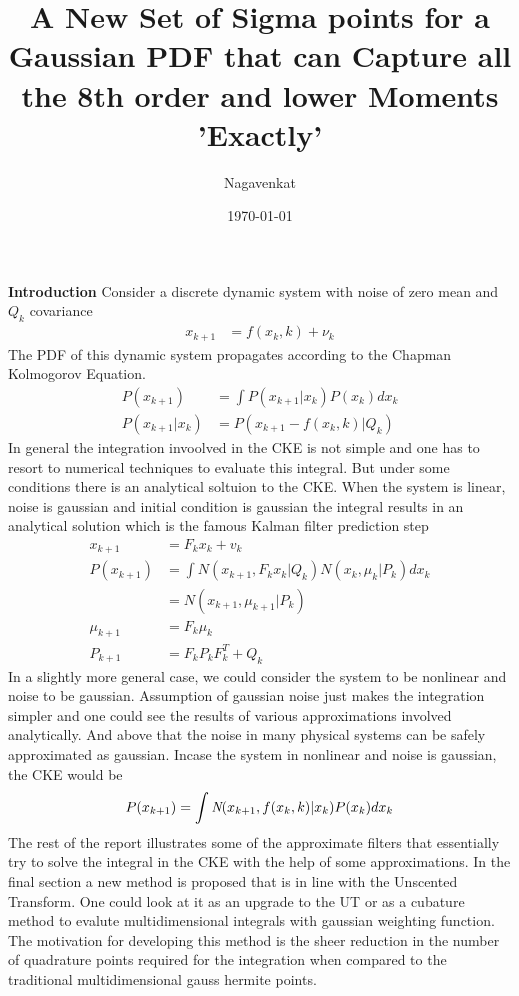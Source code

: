 \documentclass{article}
\title{A New Set of Sigma points for a Gaussian PDF that can Capture all the 8th order and lower Moments 'Exactly'}
\date{\today}
\author{Nagavenkat}
\begin{document}
\maketitle
{\bf Introduction}\newline\newline
Consider a discrete dynamic system with noise of zero mean and $Q_k$ covariance
\begin{align}
x_{k+1}&=f(x_k,k)+\nu_k
\end{align}
	The PDF of this dynamic system propagates according to the Chapman Kolmogorov Equation.
	\begin{align}
	P(x_{k+1})&=\int{P(x_{k+1}|x_k)P(x_k)}dx_k\\
	P(x_{k+1}|x_k)&=P(x_{k+1}-f(x_k,k)|Q_k)
	\end{align}
	In general the integration invoolved in the CKE is not simple and one has to resort to numerical techniques to evaluate this integral. But under some conditions there is an analytical soltuion to the CKE. When the system is linear, noise is gaussian and initial condition is gaussian the integral results in an analytical solution which is the famous Kalman filter prediction step 
	\begin{align}
	x_{k+1}&=F_kx_k+v_k\\
	P(x_{k+1})&=\int{N(x_{k+1},F_kx_k|Q_k)N(x_k,\mu_k|P_k)}dx_k\\
            &=N(x_{k+1},\mu_{k+1}|P_k)\\
   \mu_{k+1}&=F_k\mu_k\\
   P_{k+1}&=F_kP_kF_k^T+Q_k
	\end{align}
	In a slightly more general case, we could consider the system to be nonlinear and noise to be gaussian. Assumption of gaussian noise just makes the integration simpler and one could see the results of various approximations involved analytically. And above that the noise in many physical systems can be safely approximated as gaussian.\newline	
	Incase the system in nonlinear and noise is gaussian, the CKE would be
	\begin{align}
	P(x_{k+1})=\int{{\bf\emph{N}}(x_{k+1},f(x_k,k)|x_k)P(x_k)}dx_k
	\end{align}
	The rest of the report illustrates some of the approximate filters that essentially try to solve the integral in the CKE with the help of some approximations. In the final section a new method is proposed that is in line with the Unscented Transform. One could look at it as an upgrade to the UT or as a cubature method to evalute multidimensional integrals with gaussian weighting function. The motivation for developing this method is the sheer reduction in the number of quadrature points required for the integration when compared to the traditional multidimensional gauss hermite points.    
\end{document}
